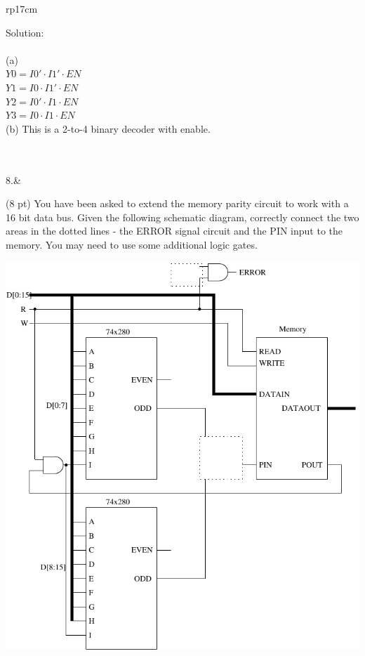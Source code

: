 \documentclass{article}
\begin{document}
\begin{longtable}[l]{rp{17cm}}
\begin{minipage}[t]{\linewidth}
Solution: \\ \\
(a)\\
$Y0 = I0' \cdot I1' \cdot EN$\\
$Y1 = I0 \cdot I1' \cdot EN$\\
$Y2 = I0' \cdot I1 \cdot EN$\\
$Y3 = I0 \cdot I1 \cdot EN$\\
(b) This is a 2-to-4 binary decoder with enable.\\ \\
\end{minipage}\\
\medskip
8.&\begin{minipage}[t]{\linewidth}(8 pt) You have been asked to extend the memory parity circuit to work with a 16 bit data bus.  Given the following schematic diagram, correctly connect the two areas in the dotted lines - the ERROR signal circuit and the PIN input to the memory.  You may need to use some additional logic gates.
\begin{center}
  \includegraphics[scale=0.5]{../XOR/Assessments/MemoryCircuitParityExtended}
\end{center}


\end{minipage}
\end{longtable}
\end{document}
